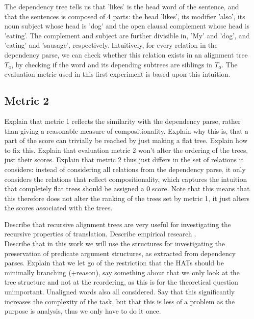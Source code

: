 \documentclass{report}
\theoremstyle{definition}
\theoremstyle{plain}
\begin{document}
\noindent The dependency tree tells us that 'likes' is the head word of the sentence, and that the sentences is composed of 4 parts: the head 'likes', its modifier 'also', its noun subject whose head is 'dog' and the open clausal complement whose head is 'eating'. The complement and subject are further divisible in, 'My' and 'dog', and 'eating' and 'sausage', respectively. Intuitively, for every relation in the dependency parse, we can check whether this relation exists in an alignment tree $T_a$, by checking if the word and its depending subtrees are siblings in $T_a$. The evaluation metric used in this first experiment is based upon this intuition.



\subsection{Metric 2}

Explain that metric 1 reflects the similarity with the dependency parse, rather than giving a reasonable measure of compositionality. Explain why this is, that a part of the score can trivially be reached by just making a flat tree. Explain how to fix this. Explain that evaluation metric 2 won't alter the ordering of the trees, just their scores.
Explain that metric 2 thus just differs in the set of relations it considers: instead of considering all relations from the dependency parse, it only considers the relations that reflect compositionality, which captures the intuition that completely flat trees should be assigned a 0 score. Note that this means that this therefore does not alter the ranking of the trees set by metric 1, it just alters the scores associated with the trees.




Describe that recursive alignment trees are very useful for investigating the recursive properties of translation. Describe empirical research \cite{simaan2013hats}.\\
Describe that in this work we will use the structures for investigating the preservation of predicate argument structures, as extracted from dependency parses. Explain that we let go of the restriction that the HATs should be minimally branching (+reason), say something about that we only look at the tree structure and not at the reordering, as this is for the theoretical question unimportant.
Unaligned words also all considered. Say that this significantly increases the complexity of the task, but that this is less of a problem as the purpose is analysis, thus we only have to do it once.
\end{document}
